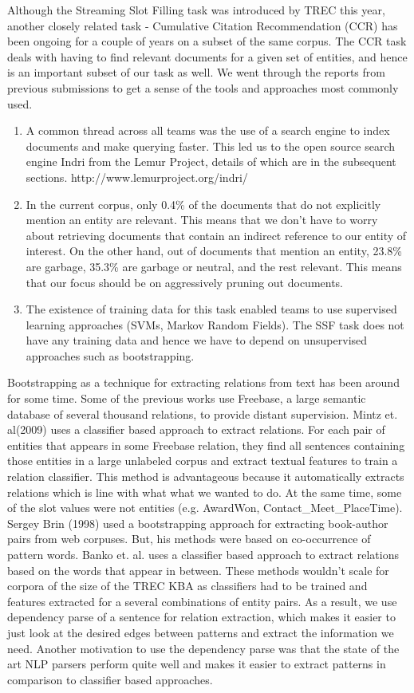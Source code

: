 Although the Streaming Slot Filling task was introduced by TREC this year, another closely related task - Cumulative Citation Recommendation (CCR) has been ongoing for a couple of years on a subset of the same corpus. The CCR task deals with having to find relevant documents for a given set of entities, and hence is an important subset of our task as well. We went through the reports from previous submissions to get a sense of the tools and approaches most commonly used. 
\begin{enumerate}
\item A common thread across all teams was the use of a search engine to index documents and make querying faster. This led us to the open source search engine Indri from the Lemur Project, details of which are in the subsequent sections. http://www.lemurproject.org/indri/
\item In the current corpus, only 0.4\% of the documents that do not explicitly mention an entity are relevant. This means that we don’t have to worry about retrieving documents that contain an indirect reference to our entity of interest. On the other hand, out of documents that mention an entity, 23.8\% are garbage, 35.3\% are garbage or neutral, and the rest relevant. This means  that our focus should be on aggressively pruning out documents.
\item The existence of training data for this task enabled teams to use supervised learning approaches (SVMs, Markov Random Fields). The SSF task does not have any training data and hence we have to depend on unsupervised approaches such as bootstrapping. 
\end{enumerate}

Bootstrapping as a technique for extracting relations from text has been around for some time. Some of the previous works use Freebase, a large semantic database of several thousand relations, to provide distant supervision. Mintz et. al(2009) uses a classifier based approach to extract relations. For each pair of entities that appears in some Freebase relation, they find all sentences containing those entities in a large unlabeled corpus and extract textual features to train a relation classiﬁer. This method is advantageous because it automatically extracts relations which is line with what what we wanted to do. At the same time, some of the slot values were not entities (e.g. AwardWon, Contact\_Meet\_PlaceTime). Sergey Brin (1998) used a bootstrapping approach for extracting book-author pairs from web corpuses. But, his methods were based on co-occurrence of pattern words. Banko et. al. uses a classifier based approach to extract relations based on the words that appear in between. These methods wouldn’t scale for corpora of the size of the TREC KBA as classifiers had to be trained and features extracted for a several combinations of entity pairs. As a result, we use dependency parse of a sentence for relation extraction, which makes it easier to just look at the desired edges between patterns and extract the information we need. Another motivation to use the dependency parse was that the state of the art NLP parsers perform quite well and makes it easier to extract patterns in comparison to classifier based approaches.

